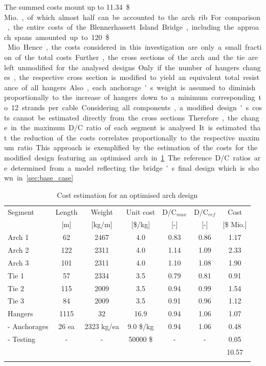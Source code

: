 The summed costs mount up to \SI{11.34}{\$\,Mio.}, of which almost half can be accounted to the arch rib. For comparison, the entire costs of the Blennerhassett Island Bridge, including the approach spans amounted up to \SI{120}{\$\,Mio}. Hence, the costs considered in this investigation are only a small fraction of the total costs. Further, the cross sections of the arch and the tie are left unmodified for the analysed designs. Only if the number of hangers changes, the respective cross section is modified to yield an equivalent total resistance of all hangers. Also, each anchorage's weight is assumed to diminish proportionally to the increase of hangers down to a minimum corresponding to 12 strands per cable. Considering all components, a modified design's costs cannot be estimated directly from the cross sections. Therefore, the change in the maximum D/C ratio of each segment is analysed. It is estimated that the reduction of the costs correlates proportionally to the respective maximum ratio. This approach is exemplified by the estimation of the costs for the modified design featuring an optimised arch in \ref{tab:met_cost_estimation}. The reference D/C ratios are determined from a model reflecting the bridge's final design which is shown in \ref{sec:base_case}

\begin{table}[H]
    \centering
    \caption{Cost estimation for an optimised arch design}
    \label{tab:met_cost_estimation}
    \begin{tabular}{lcccccc}
    \toprule
    Segment & Length & Weight & Unit cost & D/C$_{max}$ & D/C$_{ref}$ & Cost \\
     & [m] & [kg/m] & [\$/kg] & [-] & [-] & [\$ Mio.] \\ \hline
    Arch 1 & 62 & 2467 & 4.0 & 0.83 & 0.86 & 1.17 \\
    Arch 2 & 122 & 2311 & 4.0 & 1.14 & 1.09 & 2.33 \\
    Arch 3 & 101 & 2311 & 4.0 & 1.10 & 1.08 & 1.90 \\
    Tie 1 & 57 & 2334 & 3.5 & 0.79 & 0.81 & 0.91 \\
    Tie 2 & 115 & 2009 & 3.5 & 0.94 & 0.99 & 1.54 \\
    Tie 3 & 84 & 2009 & 3.5 & 0.91 & 0.96 & 1.12 \\
    Hangers & 1115 & 32 & 16.9 & 0.94 & 1.06 & 1.07 \\
    \arrayrulecolor[gray]{0.4} \midrule
    - Anchorages & 26 ea & 2323 kg/ea & 9.0 \$/kg & 0.94 & 1.06 & 0.48 \\
    - Testing & - & - & 50000 \$ & - & - & 0.05 \\ \arrayrulecolor[rgb]{0,0,0} \bottomrule
    & & & & & & 10.57 \\ \hhline{~~~~~~ =}
    \end{tabular}
    \end{table}

